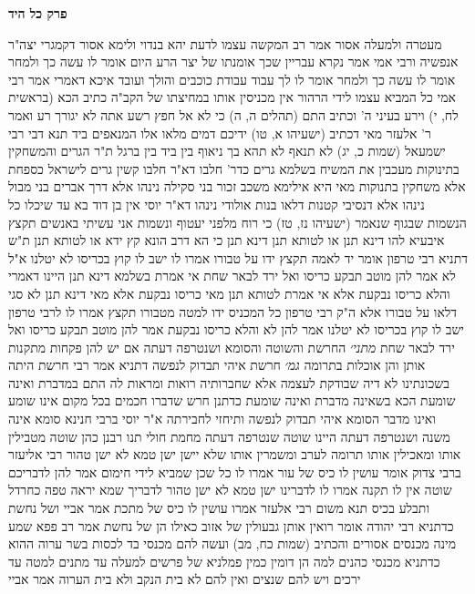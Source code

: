 \documentclass[12pt, openany]{book}
\newcommand{\sethebfont}{
\fontsize{10.5pt}{21.0pt} \selectfont
}
\newcommand{\twocol}[1]{
	{\sethebfont \begin{multicols}{2}
			#1
	\end{multicols}}	
}
\newcommand{\chapname}{}
\newcommand{\newchap}[1]{
	\addcontentsline{toc}{chapter}{#1}
	\renewcommand{\chapname}{#1}
		\begin{center}
			\textbf{%
\fontsize{16pt}{16pt}\selectfont
				#1}
		\end{center}
}
\begin{document}
\newchap{פרק  כל היד}
\twocol{מעטרה ולמעלה אסור 
אמר רב  המקשה עצמו לדעת יהא בנדוי  ולימא אסור  דקמגרי יצה"ר אנפשיה  ורבי אמי אמר  נקרא עבריין שכך אומנתו של יצר הרע היום אומר לו  עשה כך ולמחר אומר לו  עשה כך ולמחר אומר לו  לך עבוד עבודת כוכבים והולך ועובד 
איכא דאמרי אמר רבי אמי  כל המביא עצמו לידי הרהור אין מכניסין אותו במחיצתו של הקב"ה  כתיב הכא  (בראשית לח, י) וירע בעיני ה' וכתיב התם  (תהלים ה, ה) כי לא אל חפץ רשע אתה לא יגורך רע 
ואמר ר' אלעזר  מאי דכתיב (ישעיהו א, טו) ידיכם דמים מלאו אלו המנאפים ביד  תנא דבי רבי ישמעאל  (שמות כ, יג) לא תנאף לא תהא בך ניאוף בין ביד בין ברגל 
ת"ר  הגרים והמשחקין בתינוקות מעכבין את המשיח  בשלמא גרים כדר' חלבו דא"ר חלבו קשין גרים לישראל כספחת  אלא משחקין בתנוקות מאי היא 
אילימא משכב זכור בני סקילה נינהו  אלא דרך אברים בני מבול נינהו 
אלא דנסיבי קטנות דלאו בנות אולודי נינהו  דא"ר יוסי  אין בן דוד בא עד שיכלו כל הנשמות שבגוף שנאמר  (ישעיהו נז, טז) כי רוח מלפני יעטוף ונשמות אני עשיתי
באנשים תקצץ איבעיא להו  דינא תנן או לטותא תנן  דינא תנן כי הא דרב הונא קץ ידא או לטותא תנן 
ת"ש דתניא רבי טרפון אומר  יד לאמה תקצץ ידו על טבורו  אמרו לו  ישב לו קוץ בכריסו לא יטלנו  א"ל  לא  אמר להן  מוטב תבקע כריסו ואל ירד לבאר שחת 
אי אמרת בשלמא דינא תנן היינו דאמרי והלא כריסו נבקעת אלא אי אמרת לטותא תנן מאי כריסו נבקעת  אלא מאי דינא תנן  לא סגי דלאו על טבורו 
אלא ה"ק רבי טרפון  כל המכניס ידו למטה מטבורו תקצץ אמרו לו לרבי טרפון  ישב לו קוץ בכריסו לא יטלנו  אמר להן  לא  והלא כריסו נבקעת  אמר להן  מוטב תבקע כריסו ואל ירד לבאר שחת
{\large\emph{מתני׳}} החרשת והשוטה והסומא ושנטרפה דעתה אם יש להן פקחות מתקנות אותן והן אוכלות בתרומה
{\large\emph{גמ׳}} חרשת איהי תבדוק לנפשה  דתניא אמר רבי  חרשת היתה בשכונתינו לא דיה שבודקת לעצמה אלא שחברותיה רואות ומראות לה 
התם במדברת ואינה שומעת הכא בשאינה מדברת ואינה שומעת  כדתנן  חרש שדברו חכמים בכל מקום אינו שומע ואינו מדבר
הסומא איהי תבדוק לנפשה ותיחזי לחבירתה  א"ר יוסי ברבי חנינא  סומא אינה משנה
ושנטרפה דעתה היינו שוטה  שנטרפה דעתה מחמת חולי 
תנו רבנן  כהן שוטה מטבילין אותו ומאכילין אותו תרומה לערב ומשמרין אותו שלא יישן ישן טמא לא ישן טהור 
רבי אליעזר ברבי צדוק אומר  עושין לו כיס של עור  אמרו לו  כל שכן שמביא לידי חימום  אמר להן  לדבריכם שוטה אין לו תקנה 
אמרו לו  לדברינו ישן טמא לא ישן טהור לדבריך שמא יראה טפה כחרדל ותבלע בכיס 
תנא משום רבי אלעזר אמרו  עושין לו כיס של מתכת 
אמר אביי  ושל נחשת  כדתניא רבי יהודה אומר  רואין אותן גבעולין של אזוב כאילו הן של נחשת 
אמר רב פפא  שמע מינה מכנסים אסורים  והכתיב (שמות כח, מב) ועשה להם מכנסי בד לכסות בשר ערוה 
ההוא כדתניא  מכנסי כהנים למה הן דומין  כמין פמלניא של פרשים  למעלה עד מתנים למטה עד ירכים ויש להם שנצים ואין להם לא בית הנקב ולא בית הערוה 
אמר אביי}
\end{document}
